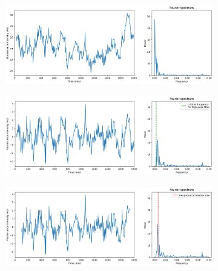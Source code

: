 
\begin{figure}
  \centering
  \begin{subfigure}[htpb]{0.8\textwidth}
   \centering
   \includegraphics[width=\textwidth]{fft_raw}
   \caption{
   }
   \label{fig:analysis-filter-raw}
  \end{subfigure}

  \begin{subfigure}[htpb]{0.8\textwidth}
   \centering
   \includegraphics[width=\textwidth]{fft_butterworth}
   \caption{
   }
   \label{fig:analysis-filter-butterworth}
  \end{subfigure}

  \begin{subfigure}[htpb]{0.8\textwidth}
   \centering
   \includegraphics[width=\textwidth]{fft_slidingwindow}
   \caption{
   }
   \label{fig:analysis-filter-movavg}
  \end{subfigure}


\end{figure}
